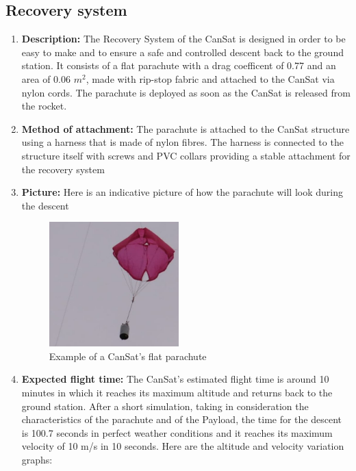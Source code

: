 \documentclass[11pt]{article}
\begin{document}
\subsection{Recovery system}
\begin{enumerate}
\item \textbf{Description:} The Recovery System of the CanSat is designed in order to be easy to make and to ensure a safe and controlled descent back to the ground station. It consists of a flat parachute with a drag coefficent of 0.77 and an area of 0.06 $m^2$, made with rip-stop fabric and attached to the CanSat via nylon cords. The parachute is deployed as soon as the CanSat is released from the rocket.
\vspace{0.25cm}
\item \textbf{Method of attachment:} The parachute is attached to the CanSat structure using a harness that is made of nylon fibres. The harness is connected to the structure itself with screws and PVC collars providing a stable attachment for the recovery system
\vspace{0.25cm}
\item \textbf{Picture:} Here is an indicative picture of how the parachute will look during the descent

\begin{figure}[H]
\includegraphics[width=5cm]{Parachute_example}
\centering
\caption{Example of a CanSat's flat parachute}
\end{figure}

\item \textbf{Expected flight time:} The CanSat's estimated flight time is around 10 minutes in which it reaches its maximum altitude and returns back to the ground station. After a short simulation, taking in consideration the characteristics of the parachute and of the Payload, the time for the descent is 100.7 seconds in perfect weather conditions and it reaches its maximum velocity of 10 m/s in 10 seconds. Here are the altitude and velocity variation graphs:


\end{enumerate}
\end{document}
